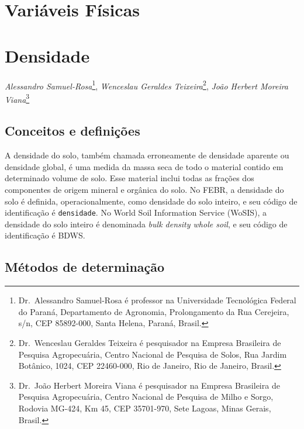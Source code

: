 \documentclass[
  a4paper,
  dvipsnames]{tufte-book}
\begin{document}
\hypertarget{variuxe1veis-fuxedsicas}{%
\chapter*{Variáveis Físicas}\label{variuxe1veis-fuxedsicas}}

\hypertarget{densidade}{%
\chapter{Densidade}\label{densidade}}

\emph{Alessandro Samuel-Rosa}\footnote{Dr.~Alessandro Samuel-Rosa é professor na Universidade Tecnológica Federal do Paraná, Departamento de Agronomia, Prolongamento da Rua Cerejeira, s/n, CEP 85892-000, Santa Helena, Paraná, Brasil.}, \emph{Wenceslau Geraldes Teixeira}\footnote{Dr.~Wenceslau Geraldes Teixeira é pesquisador na Empresa Brasileira de Pesquisa Agropecuária, Centro Nacional de Pesquisa de Solos, Rua Jardim Botânico, 1024, CEP 22460-000, Rio de Janeiro, Rio de Janeiro, Brasil.}, \emph{João Herbert Moreira Viana}\footnote{Dr.~João Herbert Moreira Viana é pesquisador na Empresa Brasileira de Pesquisa Agropecuária, Centro Nacional de Pesquisa de Milho e Sorgo, Rodovia MG-424, Km 45, CEP 35701-970, Sete Lagoas, Minas Gerais, Brasil.}

\hypertarget{conceitos-e-definiuxe7uxf5es-1}{%
\section{Conceitos e definições}\label{conceitos-e-definiuxe7uxf5es-1}}

A densidade do solo, também chamada erroneamente de densidade aparente ou densidade global, é uma medida da massa seca de todo o material contido em determinado volume de solo. Esse material inclui todas as frações dos componentes de origem mineral e orgânica do solo. No FEBR, a densidade do solo é definida, operacionalmente, como densidade do solo inteiro, e seu código de identificação é \texttt{densidade}. No World Soil Information Service (WoSIS), a densidade do solo inteiro é denominada \emph{bulk density whole soil}, e seu código de identificação é BDWS.

\hypertarget{muxe9todos-de-determinauxe7uxe3o-1}{%
\section{Métodos de determinação}\label{muxe9todos-de-determinauxe7uxe3o-1}}
\end{document}
